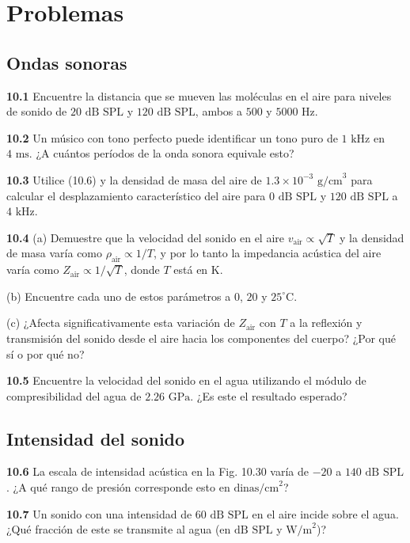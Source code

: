 \documentclass[12pt]{book}
\begin{document}
\section*{Problemas}

\subsection*{Ondas sonoras}

\noindent \textbf{10.1} Encuentre la distancia que se mueven las moléculas en el aire para niveles de sonido de $20\text{ dB SPL}$ y $120\text{ dB SPL}$, ambos a $500$ y $5000\text{ Hz}$.

\noindent \textbf{10.2} Un músico con tono perfecto puede identificar un tono puro de $1\text{ kHz}$ en $4\text{ ms}$. ¿A cuántos períodos de la onda sonora equivale esto?

\noindent \textbf{10.3} Utilice (10.6) y la densidad de masa del aire de $1.3 \times 10^{-3}\text{ g/cm}^3$ para calcular el desplazamiento característico del aire para $0\text{ dB SPL}$ y $120\text{ dB SPL}$ a $4\text{ kHz}$.

\noindent \textbf{10.4} (a) Demuestre que la velocidad del sonido en el aire $v_{\text{air}} \propto \sqrt{T}$ y la densidad de masa varía como $\rho_{\text{air}} \propto 1/T$, y por lo tanto la impedancia acústica del aire varía como $Z_{\text{air}} \propto 1/\sqrt{T}$, donde $T$ está en $\text{K}$.

(b) Encuentre cada uno de estos parámetros a $0$, $20$ y $25^\circ\text{C}$.

(c) ¿Afecta significativamente esta variación de $Z_{\text{air}}$ con $T$ a la reflexión y transmisión del sonido desde el aire hacia los componentes del cuerpo? ¿Por qué sí o por qué no?

\noindent \textbf{10.5} Encuentre la velocidad del sonido en el agua utilizando el módulo de compresibilidad del agua de $2.26\text{ GPa}$. ¿Es este el resultado esperado?

\subsection*{Intensidad del sonido}

\noindent \textbf{10.6} La escala de intensidad acústica en la Fig. 10.30 varía de $-20$ a $140\text{ dB SPL}$. ¿A qué rango de presión corresponde esto en $\text{dinas/cm}^2$?

\noindent \textbf{10.7} Un sonido con una intensidad de $60\text{ dB SPL}$ en el aire incide sobre el agua. ¿Qué fracción de este se transmite al agua (en $\text{dB SPL}$ y $\text{W/m}^2$)?
\end{document}

